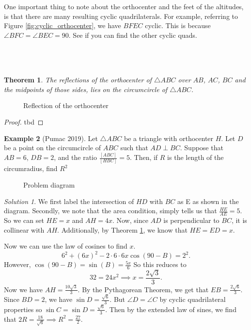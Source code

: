 \documentclass[letterpaper]{article}
\theoremstyle{plain}
\newtheorem{thm}{Theorem}[section]
\theoremstyle{definition}
\newtheorem{example}[thm]{Example}
\theoremstyle{remark}
\newtheorem*{solution}{Solution}
\begin{document}
One important thing to note about the orthocenter and the feet of the altitudes, is that there are many resulting cyclic quadrilaterals.
For example, referring to Figure \ref{fig:cyclic_orthocenter}, we have $BFEC$ cyclic. This is because $\angle BFC = \angle BEC = 90$.
See if you can find the other cyclic quads.\\\\\\\\
\begin{mdframed}
    \begin{thm}\label{reflecting_the_orthocenter}
        The reflections of the orthocenter of $\triangle ABC$ over $AB$, $AC$, $BC$ and the midpoints of those sides, lies on the circumcircle of $\triangle ABC$.
    \end{thm} 
\end{mdframed}


\begin{figure}[!htb]
    \centering
    \scalebox{.75}{}
    \caption{Reflection of the orthocenter}
    \label{fig:reflection_orthocenter}

\end{figure}
\begin{proof}
    tbd
\end{proof}

\begin{example}[Pumac 2019]
    Let $\triangle ABC$ be a triangle with orthocenter $H$. Let $D$ be a point on the circumcircle
    of $ABC$ such that $AD \perp BC$. Suppose that $AB=6$, $DB=2$, and the ratio $\frac{[ABC]}{[HBC]}=5$. Then, if $R$
    is the length of the circumradius, find $R^2$
\end{example}

\begin{figure}[!htb]
    \centering
    \scalebox{.5}{}
    \caption{Problem diagram}
    \label{fig:pumac_problem}
\end{figure}
\begin{solution}
    We first label the intersection of $HD$ with $BC$ as E as shown in the diagram.
    Secondly, we note that the area condition, simply tells us that $\frac{HE}{AE}=5$. So we can set $HE=x$ and $AH=4x$.
    Now, since $AD$ is perpendicular to $BC$, it is collinear with $AH$. Additionally, by 
    Theorem \ref{reflecting_the_orthocenter}, we know that $HE=ED=x$.

    Now we can use the law of cosines to find $x$. $$6^2+(6x)^2-2\cdot 6\cdot 6x \cos(90-B)=2^2.$$ However, $\cos(90-B)=\sin(B)=\frac{5x}{6}$
    So this reduces to $$32=24x^2 \implies x=\frac{2\sqrt{3}}{3}.$$
    Now we have $AH=\frac{10\sqrt{3}}{3}$. By the Pythagorean Theorem, we get that $EB=\frac{2\sqrt{6}}{3}$. Since $BD=2$, we have $\sin{D}=\frac{\sqrt{6}}{3}$.
    But $\angle D = \angle C$ by cyclic quadrilateral properties so $\sin{C}=\sin{D}=\frac{\sqrt{6}}{3}$. Then by the extended law of sines, we find that 
    $2R = \frac{18}{\sqrt{6}} \implies R^2=\boxed{\frac{27}{2}}$.
\end{solution}
\end{document}
